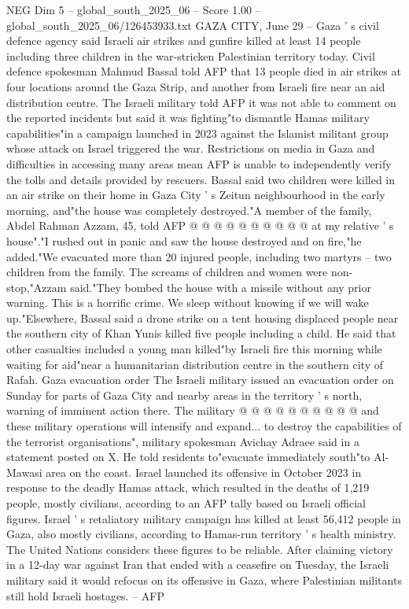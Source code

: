 \begin{textsample}{NEG Dim 5 – global\_south\_2025\_06 – Score 1.00 – global\_south\_2025\_06/126453933.txt}  \label{ex:f5_neg_414}
GAZA CITY, June 29 -- Gaza ' s civil defence agency said Israeli air strikes and gunfire killed at least 14 people including three children in the war-stricken Palestinian territory today.
Civil defence spokesman Mahmud Bassal told AFP that 13 people died in air strikes at four locations around the Gaza Strip, and another from Israeli fire near an aid distribution centre.
The Israeli military told AFP it was not able to comment on the reported incidents but said it was fighting"to dismantle Hamas military capabilities"in a campaign launched in 2023 against the Islamist militant group whose attack on Israel triggered the war.
Restrictions on media in Gaza and difficulties in accessing many areas mean AFP is unable to independently verify the tolls and details provided by rescuers.
Bassal said two children were killed in an air strike on their home in Gaza City ' s Zeitun neighbourhood in the early morning, and"the house was completely destroyed."A member of the family, Abdel Rahman Azzam, 45, told AFP @ @ @ @ @ @ @ @ @ @ at my relative ' s house"."I rushed out in panic and saw the house destroyed and on fire,"he added."We evacuated more than 20 injured people, including two martyrs -- two children from the family.
The screams of children and women were non-stop,"Azzam said."They bombed the house with a missile without any prior warning.
This is a horrific crime.
We sleep without knowing if we will wake up."Elsewhere, Bassal said a drone strike on a tent housing displaced people near the southern city of Khan Yunis killed five people including a child.
He said that other casualties included a young man killed"by Israeli fire this morning while waiting for aid"near a humanitarian distribution centre in the southern city of Rafah.
Gaza evacuation order The Israeli military issued an evacuation order on Sunday for parts of Gaza City and nearby areas in the territory ' s north, warning of imminent action there.
The military @ @ @ @ @ @ @ @ @ @ and these military operations will intensify and expand... to destroy the capabilities of the terrorist organisations", military spokesman Avichay Adraee said in a statement posted on X.
He told residents to"evacuate immediately south"to Al-Mawasi area on the coast.
Israel launched its offensive in October 2023 in response to the deadly Hamas attack, which resulted in the deaths of 1,219 people, mostly civilians, according to an AFP tally based on Israeli official figures.
Israel ' s retaliatory military campaign has killed at least 56,412 people in Gaza, also mostly civilians, according to Hamas-run territory ' s health ministry.
The United Nations considers these figures to be reliable.
After claiming victory in a 12-day war against Iran that ended with a ceasefire on Tuesday, the Israeli military said it would refocus on its offensive in Gaza, where Palestinian militants still hold Israeli hostages. -- AFP

\end{textsample}
